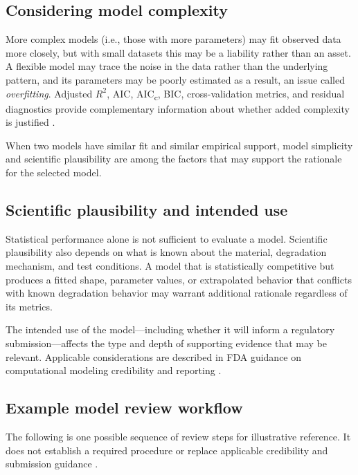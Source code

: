 \subsection{Considering model complexity}

More complex models (i.e., those with more parameters) may fit observed data more closely, but with small datasets this may be a liability rather than an asset. A flexible model may trace the noise in the data rather than the underlying pattern, and its parameters may be poorly estimated as a result, an issue called \textit{overfitting}. Adjusted \(R^2\), AIC, AIC\textsubscript{c}, BIC, cross-validation metrics, and residual diagnostics provide complementary information about whether added complexity is justified \cite{heinze2018}.

When two models have similar fit and similar empirical support, model simplicity and scientific plausibility are among the factors that may support the rationale for the selected model.


\subsection{Scientific plausibility and intended use}

Statistical performance alone is not sufficient to evaluate a model. Scientific plausibility also depends on what is known about the material, degradation mechanism, and test conditions. A model that is statistically competitive but produces a fitted shape, parameter values, or extrapolated behavior that conflicts with known degradation behavior may warrant additional rationale regardless of its metrics.

The intended use of the model---including whether it will inform a regulatory submission---affects the type and depth of supporting evidence that may be relevant. Applicable considerations are described in FDA guidance on computational modeling credibility and reporting \cite{fda_modeling_guidance,fda_reporting_guidance}.


\subsection{Example model review workflow}

The following is one possible sequence of review steps for illustrative reference. It does not establish a required procedure or replace applicable credibility and submission guidance \cite{fda_modeling_guidance,fda_reporting_guidance}.

